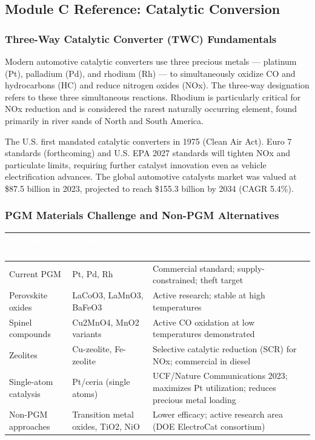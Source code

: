 \documentclass[11pt,letterpaper]{article}
\newcommand{\tableheader}[1]{\textbf{\sffamily\textcolor{white}{#1}}}
\begin{document}
\subsection{Module C Reference: Catalytic Conversion}

\subsubsection{Three-Way Catalytic Converter (TWC) Fundamentals}
Modern automotive catalytic converters use three precious metals — platinum (Pt), palladium (Pd), and rhodium (Rh) — to simultaneously oxidize CO and hydrocarbons (HC) and reduce nitrogen oxides (NOx). The three-way designation refers to these three simultaneous reactions. Rhodium is particularly critical for NOx reduction and is considered the rarest naturally occurring element, found primarily in river sands of North and South America.

The U.S. first mandated catalytic converters in 1975 (Clean Air Act). Euro 7 standards (forthcoming) and U.S. EPA 2027 standards will tighten NOx and particulate limits, requiring further catalyst innovation even as vehicle electrification advances. The global automotive catalysts market was valued at \$87.5 billion in 2023, projected to reach \$155.3 billion by 2034 (CAGR 5.4\%).

\subsubsection{PGM Materials Challenge and Non-PGM Alternatives}

\begin{center}
\begin{tabularx}{\textwidth}{L{3cm}L{4cm}X}
\toprule
{}
\tableheader{Material Class} & \tableheader{Candidate Materials} & \tableheader{Status} \\
\midrule
Current PGM & Pt, Pd, Rh & Commercial standard; supply-constrained; theft target \\
Perovskite oxides & LaCoO3, LaMnO3, BaFeO3 & Active research; stable at high temperatures \\
Spinel compounds & Cu2MnO4, MnO2 variants & Active CO oxidation at low temperatures demonstrated \\
Zeolites & Cu-zeolite, Fe-zeolite & Selective catalytic reduction (SCR) for NOx; commercial in diesel \\
Single-atom catalysis & Pt/ceria (single atoms) & UCF/Nature Communications 2023; maximizes Pt utilization; reduces precious metal loading \\
Non-PGM approaches & Transition metal oxides, TiO2, NiO & Lower efficacy; active research area (DOE ElectroCat consortium) \\
\bottomrule
\end{tabularx}
\end{center}
\end{document}
